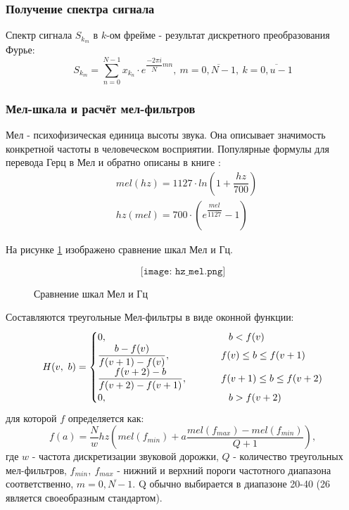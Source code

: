 \subsubsection{Получение спектра сигнала}
Спектр сигнала $S_{k_m}$ в $k$-ом фрейме - результат дискретного преобразования Фурье:
\begin{equation}
	S_{k_m} = \sum_{n=0}^{N-1} x_{k_n} \cdot e^{\dfrac{-2\pi i}{N}mn},~m=\overline{0,N-1},~k=\overline{0,u-1}
\end{equation}

\subsubsection{Мел-шкала и расчёт мел-фильтров}
Мел - психофизическая единица высоты звука. Она описывает значимость конкретной частоты в человеческом восприятии. 
Популярные формулы для перевода Герц в 
Мел и обратно описаны в книге \cite{Mel}:
\begin{align}
	&mel(hz) = 1127 \cdot ln(1 + \dfrac{hz}{700})\\
	&hz(mel) = 700 \cdot (e^{\dfrac{mel}{1127}}-1)
\end{align}

На рисунке \ref{fig:hz_mel} изображено сравнение шкал Мел и Гц.

\begin{figure}[H]
	\[\texttt{[image: hz\_mel.png]}\]
	\caption{Сравнение шкал Мел и Гц}
	\label{fig:hz_mel}
\end{figure}


Составляются треугольные Мел-фильтры в виде оконной функции:
\begin{equation}
	H(v,~b)=
	\begin{cases}
		0, 										     & \Phantom \phantom{-}    b < f(v)\\
		\dfrac{b-f(v)}{f(v+1)-f(v)},   & \Phantom f(v) \leq b \leq f(v+1)\\
		\dfrac{f(v+2)-b}{f(v+2)-f(v+1)}, & \Phantom f(v+1) \leq b \leq f(v+2)\\
		0,                                           & \Phantom \phantom{-}   b > f(v+2)\\
	\end{cases}
\end{equation}
для которой $f$ определяется как:
\begin{equation}
	f(a)=\dfrac{N}{w} hz(mel(f_{min})+a \dfrac{mel(f_{max})-mel(f_{min})}{Q+1}),
\end{equation}
где $w$ - частота дискретизации звуковой дорожки, $Q$ - количество треугольных мел-фильтров, $f_{min},~f_{max}$ - нижний и верхний пороги частотного диапазона соответственно, $m=\overline{0,N-1}$. Q обычно выбирается в диапазоне 20-40 (26 является своеобразным стандартом).

